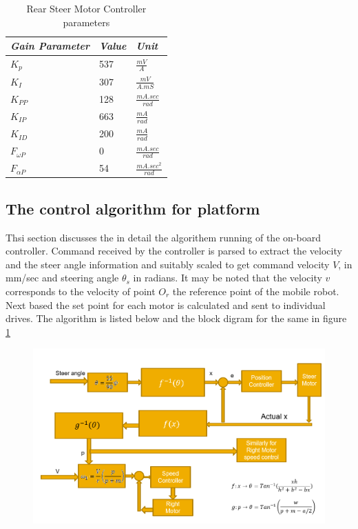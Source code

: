 \begin{table}[!htbp]
	\caption{ Rear Steer Motor Controller  parameters }
	\label{tb:steer}
	\centering
	\begin{tabular}{l l l}
		\hline
		\emph{Gain Parameter}  & \emph{ Value} & \emph{Unit} \\
		\hline
		$K_p$  & 537 &  $\frac{mV}{A}$ \\ 
		$K_I $ & 307 & $\frac{mV}{A.mS}$ \\
		$K_{PP}$& 128 & $ \frac{mA.sec}{rad}$\\
		$K_{IP}$&663&$\frac{mA}{rad}$\\
		$K_{ID}$&200&$\frac{mA}{rad}$\\
		$F_{\omega P}$& 0& $ \frac{mA.sec}{rad}$\\
		$F_{\alpha P}$& 54& $ \frac{mA.sec^2}{rad}$\\
		\hline
	\end{tabular}
\end{table}
\subsection{The control algorithm for platform}
Thsi section discusses the in detail the algorithem running of the on-board controller.  Command received by the controller is parsed to extract the velocity  and the steer angle  information and suitably scaled to get command velocity  $V$, in mm/sec and steering  angle $\theta_s$ in radians.  It may be noted that the velocity $v$ corresponds to the velocity of point $O_r$ the reference point of the mobile robot.  Next based the set point for each motor is calculated  and sent to individual drives. The algorithm is listed below and the block digram for the same in figure \ref{fig:ControlBlock}
\begin{figure}
	\includegraphics[width=\linewidth,keepaspectratio]{Chapter5/fig/BlkDigLocal}
	\label{fig:ControlBlock} 
\end{figure}

